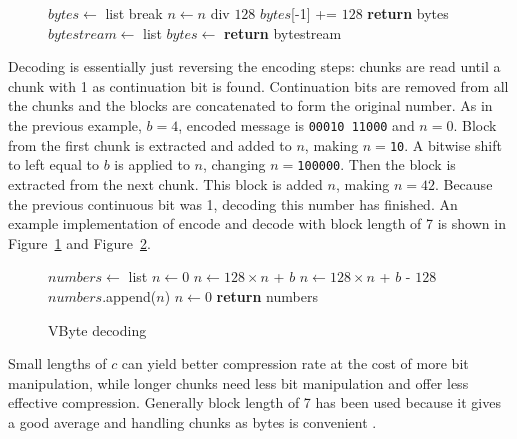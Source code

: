 \begin{figure}[ht]
\centering
  \begin{minipage}{0.5\linewidth}
\begin{algorithmic}[H]
\State $bytes\gets $ list
\State {}
 \State break \EndIf
\State $n\gets n$ div $128$
\EndWhile
\State $bytes$[-1] += $128$
\State \textbf{return} bytes
\EndFunction
\medskip
\medskip
{}
\State $bytestream\gets $ list
\State $bytes \gets$ 
\State {}
\EndFor
\State \textbf{return} bytestream
\EndFunction

\end{algorithmic}
\end{minipage}
 \label{vbyte_enc}
\end{figure}

Decoding is essentially just reversing the encoding steps: chunks are read until a chunk with 1 as continuation bit is found. Continuation bits 
are removed from all the chunks and the blocks are concatenated to form the original number. As in the previous example, $b = 4$, encoded message 
is \texttt{00010 11000} and $n = 0$. Block from the first chunk is extracted and added to $n$, making $n = $\texttt{10}. A bitwise shift to left 
equal to $b$ is applied to $n$, changing $n = $\texttt{100000}. Then the block is extracted from the next chunk. This block is added  $n$, making 
$n = 42$. Because the previous continuous bit was 1, decoding this number has finished. An example implementation of encode and decode with block 
length of 7 is shown in Figure~\ref{vbyte_enc} and Figure~\ref{vbyte_dec}.

\begin{figure}[ht]
\begin{algorithmic}
\State $numbers\gets $ list
\State $n\gets 0$
\State $n\gets 128\times n $ + $b$
\Else
\State $n\gets 128\times n $ + $b$ - $128$
\State $numbers$.append($n$)
\State $n\gets 0$
\EndIf
\EndFor
\State \textbf{return} numbers
\EndFunction
\end{algorithmic}
\caption{VByte decoding} \label{vbyte_dec}
\end{figure}

Small lengths of $c$ can yield better compression rate at the cost of more bit manipulation, while longer chunks need less bit manipulation and 
offer less effective compression. Generally block length of 7 has been used because it gives a good average and handling chunks as bytes is 
convenient \citep{Man08}.

